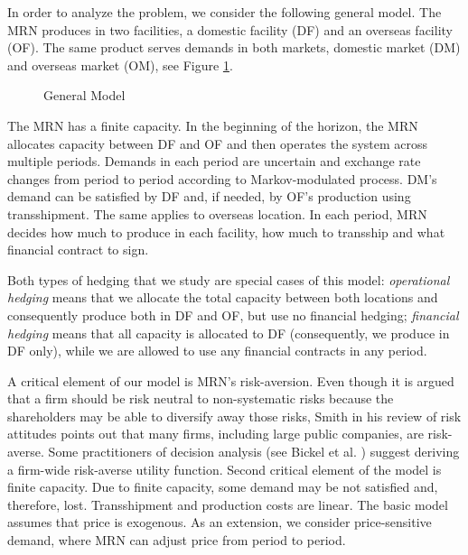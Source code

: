 \documentclass[mnsc,nonblindrev,copyedit]{informs2_wz} %
\begin{document}


In order to analyze the problem, we consider the following general model.  
The MRN produces in two facilities, a domestic facility (DF) and an overseas facility (OF).  The same product serves demands in both markets, domestic market (DM) and overseas market (OM),  see Figure \ref{figure:frameGeneral}.  
\begin{figure}[ht]
    \begin{center}
    \end{center}
    \caption{General Model}\label{figure:frameGeneral}
\end{figure}

The MRN has a finite capacity.  In the beginning of the horizon, the MRN allocates capacity between DF and OF and then operates the system across multiple periods.  Demands in each period are uncertain and exchange rate changes from period to period according to Markov-modulated process. DM's demand can be satisfied by DF and, if needed, by OF's production using transshipment.  The same applies to overseas location.  In each period, MRN decides how much to produce in each facility, how much to transship and what financial contract to sign. 

Both types of hedging that we study are special cases of this model:  {\em operational hedging} means that we allocate the total capacity between both locations and consequently produce both in DF and OF, but use no financial hedging; {\em financial hedging} means that all capacity is allocated to DF (consequently, we produce in DF only), while we are allowed to use any financial contracts in any period.

A critical element of our model is MRN's risk-aversion. Even though it is argued that a firm should be risk neutral to non-systematic risks because the shareholders may be able to diversify away those risks, Smith \cite{Smith2004} in his review of risk attitudes points out that many firms, including large public companies, are risk-averse.  Some practitioners of decision analysis (see Bickel et al.  \cite{Bickel2002}) suggest deriving a firm-wide risk-averse utility function.  
Second critical element of the model is finite capacity.  
Due to finite capacity, some demand may be not satisfied and, therefore, lost. Transshipment and production costs are linear.
The basic model assumes that price is exogenous.  As an extension, we consider price-sensitive demand, where MRN can adjust price from period to period.
\end{document}
